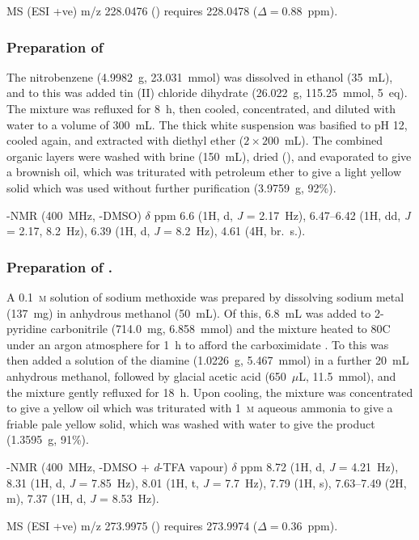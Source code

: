 \begin{refsection}
MS (ESI +ve) m/z 228.0476 ()  requires 228.0478 ($\Delta=0.88$~ppm).

\subsubsection{Preparation of }
The nitrobenzene (4.9982~g, 23.031~mmol) was dissolved in ethanol (35~mL), and to this was added tin (II) chloride dihydrate (26.022~g, 115.25~mmol, 5~eq).
The mixture was refluxed for 8~h, then cooled, concentrated, and diluted with water to a volume of 300~mL.
The thick white suspension was basified to pH 12, cooled again, and extracted with diethyl ether ($2\times200$~mL).
The combined organic layers were washed with brine (150~mL), dried (), and evaporated to give a brownish oil, which was triturated with petroleum ether to give a light yellow solid which was used without further purification (3.9759~g, 92\%).

-NMR (400~MHz, -DMSO) $\delta$ ppm 6.6 (1H, d, \emph{J} = 2.17~Hz), 6.47--6.42 (1H, dd, \emph{J} = 2.17, 8.2~Hz), 6.39 (1H, d, \emph{J} = 8.2~Hz), 4.61 (4H, br.\ s.).

\subsubsection{Preparation of .}
A 0.1~\textsc{m} solution of sodium methoxide was prepared by dissolving sodium metal (137~mg) in anhydrous methanol (50~mL).
Of this, 6.8~mL was added to 2-pyridine carbonitrile (714.0~mg, 6.858~mmol) and the mixture heated to 80\degree{}C under an argon atmosphere for 1~h to afford the carboximidate .
To this was then added a solution of the diamine  (1.0226~g, 5.467~mmol) in a further 20~mL anhydrous methanol, followed by glacial acetic acid (650~$\mu$L, 11.5~mmol), and the mixture gently refluxed for 18~h.
Upon cooling, the mixture was concentrated to give a yellow oil which was triturated with 1~\textsc{m} aqueous ammonia to give a friable pale yellow solid, which was washed with water to give the product (1.3595~g, 91\%).

-NMR (400~MHz, -DMSO + \textit{d}-TFA vapour) $\delta$ ppm 8.72 (1H, d, \emph{J} = 4.21~Hz), 8.31 (1H, d, \emph{J} = 7.85~Hz), 8.01 (1H, t, \emph{J} = 7.7~Hz), 7.79 (1H, s), 7.63--7.49 (2H, m), 7.37 (1H, d, \emph{J} = 8.53~Hz).

MS (ESI +ve) m/z 273.9975 ()  requires 273.9974 ($\Delta=0.36$~ppm).


\end{refsection}
